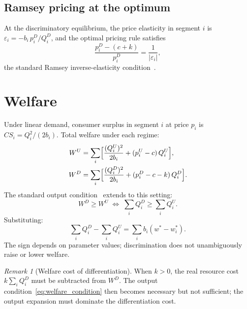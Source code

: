 \documentclass[11pt,a4paper]{article}
\theoremstyle{plain}
\theoremstyle{definition}
\theoremstyle{remark}
\newtheorem{remark}[theorem]{Remark}
\newcommand{\abs}[1]{\lvert #1 \rvert}
\begin{document}
\subsection{Ramsey pricing at the optimum}\label{sec:ramsey}

At the discriminatory equilibrium, the price elasticity in segment $i$ is $\varepsilon_i = -b_i\,p_i^D/Q_i^D$, and the optimal pricing rule satisfies
\begin{equation}\label{eq:ramsey}
  \frac{p_i^D - (c+k)}{p_i^D} = \frac{1}{\abs{\varepsilon_i}},
\end{equation}
the standard Ramsey inverse-elasticity condition~\cite{Varian1989}.


\section{Welfare}\label{sec:welfare}

Under linear demand, consumer surplus in segment $i$ at price $p_i$ is $CS_i = Q_i^2/(2b_i)$.
Total welfare under each regime:
\begin{align}
  W^U &= \sum_{i}\Bigl[\frac{(Q_i^U)^2}{2b_i} + (p_i^U - c)\,Q_i^U\Bigr], \label{eq:wu}\\
  W^D &= \sum_{i}\Bigl[\frac{(Q_i^D)^2}{2b_i} + (p_i^D - c - k)\,Q_i^D\Bigr]. \label{eq:wd}
\end{align}
The standard output condition~\cite{Schmalensee1981} extends to this setting:
\begin{equation}\label{eq:welfare_condition}
  W^D \ge W^U \;\Longleftrightarrow\; \sum_i Q_i^D \ge \sum_i Q_i^U.
\end{equation}
Substituting:
\begin{equation}\label{eq:output_condition}
  \sum_i Q_i^D - \sum_i Q_i^U = \sum_i b_i(w^* - w_i^*).
\end{equation}
The sign depends on parameter values; discrimination does not unambiguously raise or lower welfare.

\begin{remark}[Welfare cost of differentiation]\label{rem:k_welfare}
When $k>0$, the real resource cost $k\sum_i Q_i^D$ must be subtracted from $W^D$.
The output condition~\eqref{eq:welfare_condition} then becomes necessary but not sufficient; the output expansion must dominate the differentiation cost.
\end{remark}


\end{document}
